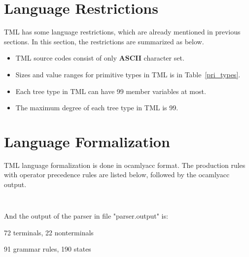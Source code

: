 \documentclass[12pt,psfig,a4]{article}
\begin{document}

\section{Language Restrictions}
TML has some language restrictions, which are already mentioned in previous sections. In this section, the restrictions are summarized as below.
\begin{itemize}
\setlength{\itemsep}{0pt}
\setlength{\parskip}{0pt}
\item TML source codes consist of only \textbf{ASCII} character set.
\item Sizes and value ranges for primitive types in TML is in Table~\ref{pri_types}.
\item Each tree type in TML can have 99 member variables at most.
\item The maximum degree of each tree type in TML is 99.
\end{itemize}

\section{Language Formalization}
TML language formalization is done in ocamlyacc format. The production rules with operator precedence rules are listed below, followed by the ocamlyacc output.

\tt
\lstset{basicstyle=\footnotesize}


\mbox{}

\noindent
And the output of the parser in file "parser.output" is:

72 terminals, 22 nonterminals

91 grammar rules, 190 states









\end{document}
